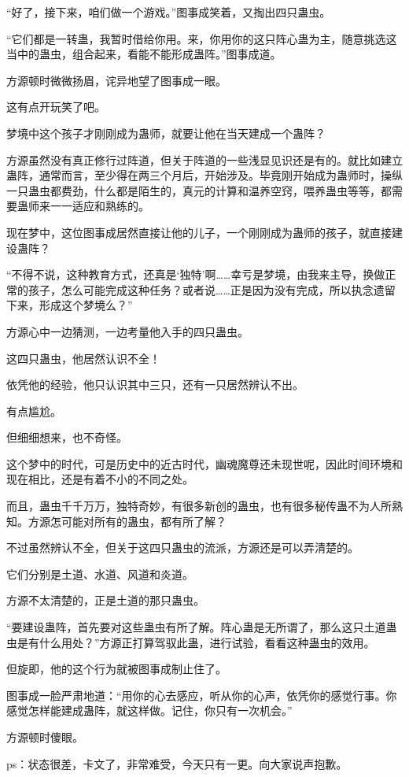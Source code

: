 \begin{this_body}
“好了，接下来，咱们做一个游戏。”图事成笑着，又掏出四只蛊虫。

“它们都是一转蛊，我暂时借给你用。来，你用你的这只阵心蛊为主，随意挑选这当中的蛊虫，组合起来，看能不能形成蛊阵。”图事成道。

方源顿时微微扬眉，诧异地望了图事成一眼。

这有点开玩笑了吧。

梦境中这个孩子才刚刚成为蛊师，就要让他在当天建成一个蛊阵？

方源虽然没有真正修行过阵道，但关于阵道的一些浅显见识还是有的。就比如建立蛊阵，通常而言，至少得在两三个月后，开始涉及。毕竟刚开始成为蛊师时，操纵一只蛊虫都费劲，什么都是陌生的，真元的计算和温养空窍，喂养蛊虫等等，都需要蛊师来一一适应和熟练的。

现在梦中，这位图事成居然直接让他的儿子，一个刚刚成为蛊师的孩子，就直接建设蛊阵？

“不得不说，这种教育方式，还真是‘独特’啊……幸亏是梦境，由我来主导，换做正常的孩子，怎么可能完成这种任务？或者说……正是因为没有完成，所以执念遗留下来，形成这个梦境么？”

方源心中一边猜测，一边考量他入手的四只蛊虫。

这四只蛊虫，他居然认识不全！

依凭他的经验，他只认识其中三只，还有一只居然辨认不出。

有点尴尬。

但细细想来，也不奇怪。

这个梦中的时代，可是历史中的近古时代，幽魂魔尊还未现世呢，因此时间环境和现在相比，还是有着不小的不同之处。

而且，蛊虫千千万万，独特奇妙，有很多新创的蛊虫，也有很多秘传蛊不为人所熟知。方源怎可能对所有的蛊虫，都有所了解？

不过虽然辨认不全，但关于这四只蛊虫的流派，方源还是可以弄清楚的。

它们分别是土道、水道、风道和炎道。

方源不太清楚的，正是土道的那只蛊虫。

“要建设蛊阵，首先要对这些蛊虫有所了解。阵心蛊是无所谓了，那么这只土道蛊虫是有什么用处？”方源正打算驾驭此蛊，进行试验，看看这种蛊虫的效用。

但旋即，他的这个行为就被图事成制止住了。

图事成一脸严肃地道：“用你的心去感应，听从你的心声，依凭你的感觉行事。你感觉怎样能建成蛊阵，就这样做。记住，你只有一次机会。”

方源顿时傻眼。

ps：状态很差，卡文了，非常难受，今天只有一更。向大家说声抱歉。

\end{this_body}

